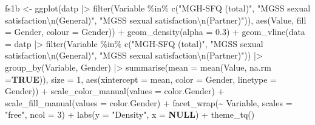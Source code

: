 \documentclass[
  bookmarksnumbered]{article}
\newenvironment{Shaded}{\begin{snugshade}}{\end{snugshade}}
\newcommand{\AttributeTok}[1]{\textcolor[rgb]{0.80,0.80,0.80}{#1}}
\newcommand{\ConstantTok}[1]{\textcolor[rgb]{0.86,0.64,0.64}{\textbf{#1}}}
\newcommand{\DecValTok}[1]{\textcolor[rgb]{0.86,0.86,0.80}{#1}}
\newcommand{\FloatTok}[1]{\textcolor[rgb]{0.75,0.75,0.82}{#1}}
\newcommand{\FunctionTok}[1]{\textcolor[rgb]{0.94,0.94,0.56}{#1}}
\newcommand{\NormalTok}[1]{\textcolor[rgb]{0.80,0.80,0.80}{#1}}
\newcommand{\OtherTok}[1]{\textcolor[rgb]{0.94,0.94,0.56}{#1}}
\newcommand{\SpecialCharTok}[1]{\textcolor[rgb]{0.86,0.64,0.64}{#1}}
\newcommand{\StringTok}[1]{\textcolor[rgb]{0.80,0.58,0.58}{#1}}
\begin{document}
\begin{Shaded}
\begin{Highlighting}[]
\NormalTok{fs1b }\OtherTok{\textless{}{-}} \FunctionTok{ggplot}\NormalTok{(datp }\SpecialCharTok{|\textgreater{}}
                 \FunctionTok{filter}\NormalTok{(Variable }\SpecialCharTok{\%in\%} \FunctionTok{c}\NormalTok{(}\StringTok{"MGH{-}SFQ (total)"}\NormalTok{,}
                                        \StringTok{"MGSS sexual satisfaction}\SpecialCharTok{\textbackslash{}n}\StringTok{(General)"}\NormalTok{,}
                                        \StringTok{"MGSS sexual satisfaction}\SpecialCharTok{\textbackslash{}n}\StringTok{(Partner)"}\NormalTok{)),}
             \FunctionTok{aes}\NormalTok{(Value,}
                 \AttributeTok{fill =}\NormalTok{ Gender,}
                 \AttributeTok{colour =}\NormalTok{ Gender)) }\SpecialCharTok{+}
        \FunctionTok{geom\_density}\NormalTok{(}\AttributeTok{alpha =} \FloatTok{0.3}\NormalTok{) }\SpecialCharTok{+}
        \FunctionTok{geom\_vline}\NormalTok{(}\AttributeTok{data =}\NormalTok{ datp }\SpecialCharTok{|\textgreater{}}
                     \FunctionTok{filter}\NormalTok{(Variable }\SpecialCharTok{\%in\%} \FunctionTok{c}\NormalTok{(}\StringTok{"MGH{-}SFQ (total)"}\NormalTok{,}
                                            \StringTok{"MGSS sexual satisfaction}\SpecialCharTok{\textbackslash{}n}\StringTok{(General)"}\NormalTok{,}
                                            \StringTok{"MGSS sexual satisfaction}\SpecialCharTok{\textbackslash{}n}\StringTok{(Partner)"}\NormalTok{)) }\SpecialCharTok{|\textgreater{}} 
                     \FunctionTok{group\_by}\NormalTok{(Variable, Gender) }\SpecialCharTok{|\textgreater{}}
                     \FunctionTok{summarise}\NormalTok{(}\AttributeTok{mean =} \FunctionTok{mean}\NormalTok{(Value, }\AttributeTok{na.rm =}\ConstantTok{TRUE}\NormalTok{)),}
                   \AttributeTok{size =} \DecValTok{1}\NormalTok{,}
                   \FunctionTok{aes}\NormalTok{(}\AttributeTok{xintercept =}\NormalTok{ mean, }\AttributeTok{color =}\NormalTok{ Gender, }\AttributeTok{linetype =}\NormalTok{ Gender)) }\SpecialCharTok{+}
        \FunctionTok{scale\_color\_manual}\NormalTok{(}\AttributeTok{values =}\NormalTok{ color.Gender) }\SpecialCharTok{+}
        \FunctionTok{scale\_fill\_manual}\NormalTok{(}\AttributeTok{values =}\NormalTok{ color.Gender) }\SpecialCharTok{+}
        \FunctionTok{facet\_wrap}\NormalTok{(}\SpecialCharTok{\textasciitilde{}}\NormalTok{ Variable,}
                   \AttributeTok{scales =} \StringTok{"free"}\NormalTok{,}
                   \AttributeTok{ncol =} \DecValTok{3}\NormalTok{) }\SpecialCharTok{+}
        \FunctionTok{labs}\NormalTok{(}\AttributeTok{y =} \StringTok{"Density"}\NormalTok{,}
             \AttributeTok{x =} \ConstantTok{NULL}\NormalTok{) }\SpecialCharTok{+}
        \FunctionTok{theme\_tq}\NormalTok{()}


\end{Highlighting}
\end{Shaded}
\end{document}
